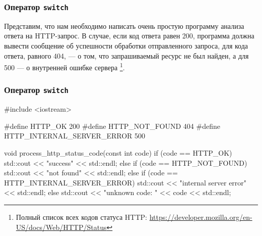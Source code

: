 \documentclass[compress, 8pt]{beamer}
\begin{document}
\begin{frame}[fragile]

    \frametitle{Оператор \texttt{switch}}

    Представим, что нам необходимо написать очень простую программу анализа
    ответа на HTTP-запрос.
    В случае, если код ответа равен 200, программа должна вывести сообщение
    об успешности обработки отправленного запроса, для кода ответа, равного
    404, — о том, что запрашиваемый ресурс не был найден, а для 500 — о
    внутренней ошибке сервера
    \footnote{Полный список всех кодов статуса HTTP:
        \url{https://developer.mozilla.org/en-US/docs/Web/HTTP/Status}}.

\end{frame}

\begin{frame}[fragile]

    \frametitle{Оператор \texttt{switch}}

    \begin{myinplacelisting}[minted language=cpp]
#include <iostream>

#define HTTP_OK 200
#define HTTP_NOT_FOUND 404
#define HTTP_INTERNAL_SERVER_ERROR 500

void process_http_status_code(const int code) {
    if (code == HTTP_OK) {
        std::cout << "success" << std::endl;
    }
    else if (code == HTTP_NOT_FOUND) {
        std::cout << "not found" << std::endl;
    }
    else if (code == HTTP_INTERNAL_SERVER_ERROR) {
        std::cout << "internal server error" << std::endl;
    }
    else {
        std::cout << "unknown code: " << code << std::endl;
    }
}
    \end{myinplacelisting}

\end{frame}
\end{document}
